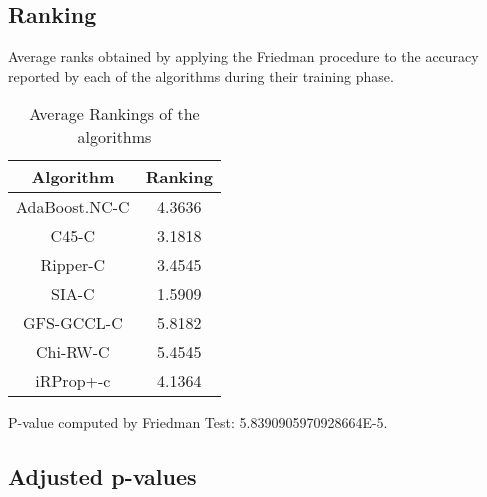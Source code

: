 \documentclass[a4paper,10pt]{article}
\begin{document}
\subsection {Ranking}
Average ranks obtained by applying the Friedman procedure to the accuracy reported by each of the algorithms during their training phase.

\begin{table}[!htp]
\caption{Average Rankings of the algorithms}
\centering
\begin{tabular}{|c|c|}\hline
Algorithm&Ranking\\\hline
AdaBoost.NC-C & 4.3636\\
C45-C & 3.1818\\
Ripper-C & 3.4545\\
SIA-C & 1.5909\\
GFS-GCCL-C & 5.8182\\
Chi-RW-C & 5.4545\\
iRProp+-c & 4.1364\\
\hline
\end{tabular}
\end{table}
\flushleft
P-value computed by Friedman Test: 5.8390905970928664E-5.\newline

\pagebreak

\subsection{Adjusted p-values}
\end{document}
